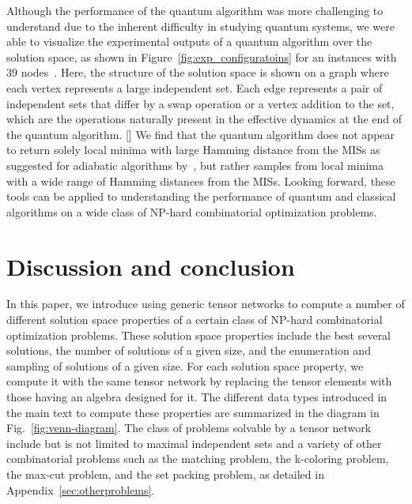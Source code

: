 \documentclass[onefignum, onetabnum]{siamart190516}
\newcommand{\<}{\langle}
\renewcommand{\>}{\rangle}
\newcommand{\Fig}[1]{Fig.~\ref{#1}}
\newcommand{\App}[1]{Appendix~\ref{#1}}
\newcommand{\blue}[1]{[{\bf  \color{blue}{JG: #1}}]}
\newcounter{example}
\begin{document}
Although the performance of the quantum algorithm was more challenging to understand due to the inherent difficulty in studying quantum systems, we were able to visualize the experimental outputs of a quantum algorithm over the solution space, as shown in Figure~\ref{fig:exp_configuratoins} for an instances with $39$ nodes~\cite{Ebadi2022}.
Here, the structure of the solution space is shown on a graph where each vertex represents a large independent set. Each edge represents a pair of  independent sets that differ by a swap operation or a vertex addition to the set, which are the operations naturally present in the effective dynamics at the end of the quantum algorithm. 
\blue{Mention the degrees of nodes in the configuration space is concentrated at a certain value, which is a feature not known before.}
We find that the quantum algorithm does not appear to return solely local minima with large Hamming distance from the MISs as suggested for adiabatic algorithms by~\cite{altshuler2010},
but rather samples from local minima with a wide range of Hamming distances from the MISs.
Looking forward, these tools can be applied to understanding the performance of quantum and classical algorithms on a wide class of NP-hard combinatorial optimization problems.

\section{Discussion and conclusion}
In this paper, we introduce using generic tensor networks to compute a number of different solution space properties of a certain class of NP-hard combinatorial optimization problems. %
These solution space properties include the best several solutions, the number of solutions of a given size, and the enumeration and sampling of solutions of a given size.
For each solution space property, we compute it with the same tensor network by replacing the tensor elements with those having an algebra designed for it. %
The different data types introduced in the main text to compute these properties are  summarized in the diagram in \Fig{fig:venn-diagram}. %
The class of problems solvable by a tensor network include but is not limited to maximal independent sets and a variety of other combinatorial problems such as the matching problem, the k-coloring problem, the max-cut problem, and the set packing problem, as detailed in \App{sec:otherproblems}. 
\end{document}

